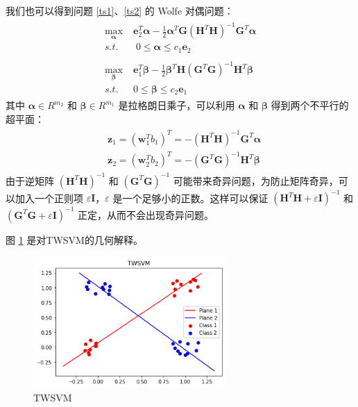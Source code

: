 我们也可以得到问题 \ref{ts1}、\ref{ts2} 的 Wolfe 对偶问题：
\begin{align}
\begin{split}
\max\limits_{\pmb{\alpha}} \; & \mathbf{e}_2^T \pmb{\alpha}-\frac{1}{2}\pmb{\alpha}^T\mathbf{G}(\mathbf{H}^T\mathbf{H})^{-1}\mathbf{G}^T\pmb{\alpha} \\
s.t. & \; 0 \leq \pmb{\alpha}\leq c_1 \mathbf{e}_2
\end{split}
\\
\begin{split}
\max\limits_{\pmb{\beta}} \; & \mathbf{e}_1^T \pmb{\beta}-\frac{1}{2}\pmb{\beta}^T\mathbf{H}(\mathbf{G}^T\mathbf{G})^{-1}\mathbf{H}^T\pmb{\beta} \\
s.t. \; & 0 \leq \pmb{\beta} \leq c_2\mathbf{e}_1
\end{split}
\end{align}
其中 $\mathbf{\alpha} \in R^{m_2}$ 和 $\mathbf{\beta}\in R^{m_1}$ 是拉格朗日乘子，可以利用 $\mathbf{\alpha}$ 和 $\mathbf{\beta}$ 得到两个不平行的超平面：
\begin{align}
\begin{split}
& \mathbf{z}_1 = (\mathbf{w}^T_1b_1)^T = -(\mathbf{H}^T\mathbf{H})^{-1} \mathbf{G}^
T\pmb{\alpha} \\
&\mathbf{z}_2 = (\mathbf{w}^T_2b_2)^T = -(\mathbf{G}^T\mathbf{G})^{-1} \mathbf{H}^T\pmb{\beta}
\end{split}
\end{align}
由于逆矩阵 $(\mathbf{H}^T\mathbf{H})^{-1}$ 和 $(\mathbf{G}^T\mathbf{G})^{-1}$ 可能带来奇异问题，为防止矩阵奇异，可以加入一个正则项 $\varepsilon \mathbf{I}$，$\varepsilon$ 是一个足够小的正数。这样可以保证 $(\mathbf{H}^T\mathbf{H}+\varepsilon \mathbf{I})^{-1}$ 和 $(\mathbf{G}^T\mathbf{G}+\varepsilon \mathbf{I})^{-1}$ 正定，从而不会出现奇异问题。

图 \ref{twsvm1} 是对TWSVM的几何解释。
\begin{figure}[ht]
\centering
\includegraphics[height=5cm]{./img/TWSVM-img.png}
\caption{TWSVM}
\label{twsvm1}
\end{figure}
